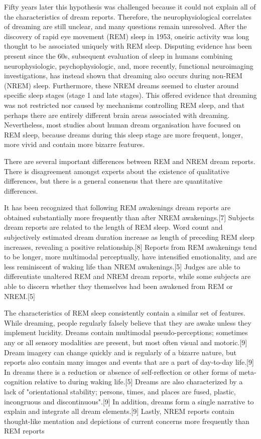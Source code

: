 Fifty years later this hypothesis was challenged because it could not explain all of the characteristics of dream reports.
Therefore, the neurophysiological correlates of dreaming are still unclear, and many questions remain unresolved.
After the discovery of rapid eye movement (REM) sleep in 1953, oneiric activity was long thought to be associated
uniquely with REM sleep.
Disputing evidence has been present since the 60s,
subsequent evaluation of sleep in humans combining neurophysiologic, psychophysiologic, and, more recently,
functional neuroimaging investigations, has instead shown that dreaming also occurs during non-REM (NREM) sleep. %
Furthermore, these NREM dreams seemed to cluster around specific sleep stages (stage 1 and late stages).
This offered evidence that dreaming was not restricted nor caused by mechanisms controlling REM sleep,
and that perhaps there are entirely different brain areas associated with dreaming.
Nevertheless, most studies about human dream organisation have focused on REM sleep, because dreams during this
sleep stage are more frequent, longer, more vivid and contain more bizarre features.

There are several important differences between REM and NREM dream reports. There is disagreement amongst experts about
the existence of qualitative differences, but there is a general consensus that there are quantitative differences.

It has been recognized that following REM awakenings dream reports are obtained substantially more frequently
than after NREM awakenings.[7] Subjects dream reports are related to the length of REM sleep. Word count and
subjectively estimated dream duration increase as length of preceding REM sleep increases, revealing a positive
relationship.[8] Reports from REM awakenings tend to be longer, more multimodal perceptually, have intensified
emotionality, and are less reminiscent of waking life than NREM awakenings.[5] Judges are able to differentiate
unaltered REM and NREM dream reports, while some subjects are able to discern whether they themselves had been awakened
from REM or NREM.[5]

The characteristics of REM sleep consistently contain a similar set of features.
While dreaming, people regularly falsely believe that they are awake unless they implement lucidity.
Dreams contain multimodal pseudo-perceptions; sometimes any or all sensory modalities are present,
but most often visual and motoric.[9] Dream imagery can change quickly and is regularly of a bizarre nature,
but reports also contain many images and events that are a part of day-to-day life.[9] In dreams there is a
reduction or absence of self-reflection or other forms of meta-cognition relative to during waking life.[5]
Dreams are also characterized by a lack of "orientational stability; persons, times, and places are fused, plastic,
incongruous and discontinuous".[9] In addition, dreams form a single narrative to explain and integrate all dream
elements.[9] Lastly, NREM reports contain thought-like mentation and depictions of current concerns more frequently
than REM reports

